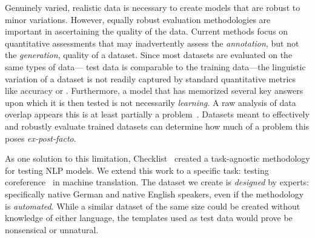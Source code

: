 \label{ch:contracat}

Genuinely varied, realistic data is necessary to create models that are robust to minor variations. 
%
However, equally robust evaluation methodologies are important in ascertaining the quality of the data. 
%
Current methods focus on quantitative assessments that may inadvertently assess the \textit{annotation}, but not the \textit{generation}, quality of a dataset.  
%
Since most datasets are evaluated on the same types of data---\squad{} test data is comparable to the training data---the linguistic variation of a dataset is not readily captured by standard quantitative metrics like accuracy or \fone{}.
%
Furthermore, a model that has memorized several key answers upon which it is then tested is not necessarily \textit{learning}.
%
A raw analysis of data overlap appears this is at least partially a problem~\citep{lewis2020question}.    
%
Datasets meant to effectively and robustly evaluate trained datasets can determine how much of a problem this poses \textit{ex-post-facto}.  

As one solution to this limitation, Checklist~\citep{ribeiro2020beyond} created a task-agnostic methodology for testing NLP models.
%
We extend this work to a specific task: testing coreference~\citep{soon2001machine} in machine translation. %
%
The dataset we create is \textit{designed} by experts: specifically native German and native English speakers, even if the methodology is \textit{automated}.
%
While a similar dataset of the same size could be created without knowledge of either language, the templates used as test data would prove be nonsensical or unnatural.  
